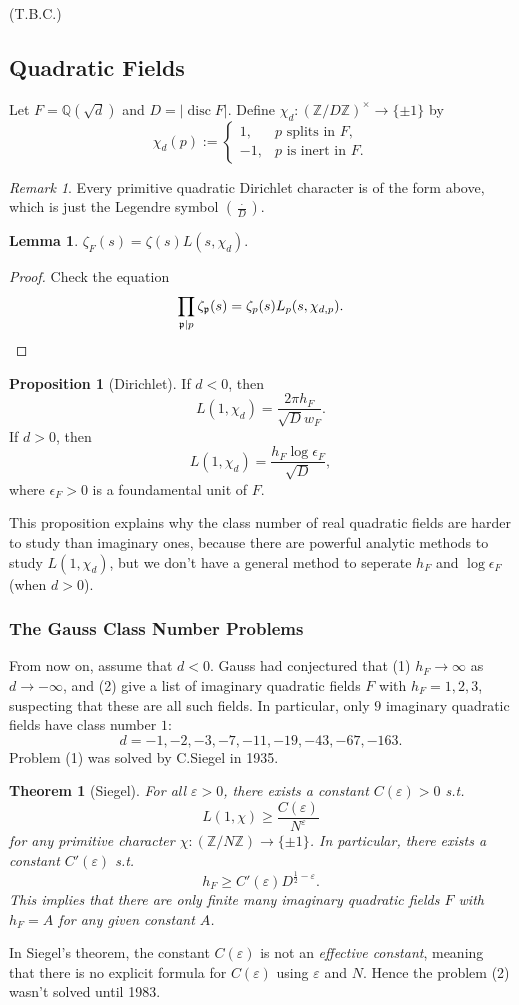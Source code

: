 \documentclass{article}
\newtheorem{theorem}{Theorem}
\theoremstyle{definition}
\newtheorem{proposition}{Proposition}[section]
\newtheorem{lemma}{Lemma}[section]
\theoremstyle{remark}
\newtheorem*{remark}{Remark}
\newcommand{\Q}{\mathbb{Q}}
\newcommand{\Z}{\mathbb{Z}}
\newcommand{\frp}{\mathfrak{p}}
\DeclareMathOperator{\disc}{disc}
\begin{document}
(T.B.C.)

\subsection{Quadratic Fields}
Let $F = \Q(\sqrt{d})$ and $D = |\disc F|$.
Define $\chi_d : (\Z/D\Z)^\times\to \{\pm 1\}$ by \[\chi_d(p) := \begin{cases}
    1,&p\text{ splits in }F,\\
    -1,&p\text{ is inert in }F.
\end{cases}\]
\begin{remark}
    Every primitive quadratic Dirichlet character is of the form above, which is just the Legendre symbol $\left( \frac{\cdot}{D} \right)$.
\end{remark}
\begin{lemma}
    $\zeta_F(s) = \zeta(s)L(s, \chi_d)$.
\end{lemma}
\begin{proof}
    Check the equation \[\prod_{\frp\mid p}\zeta_\frp(s) = \zeta_p(s)L_p(s, \chi_{d,p}).\qedhere\]
\end{proof}

\begin{proposition}[Dirichlet]
    If $d < 0$, then \[L(1, \chi_d) = \frac{2\pi h_F}{\sqrt{D}w_F}.\]
    If $d > 0$, then \[L(1, \chi_d) = \frac{h_F\log\epsilon_F}{\sqrt{D}},\]
    where $\epsilon_F > 0$ is a foundamental unit of $F$.
\end{proposition}
This proposition explains why the class number of real quadratic fields are harder to study than imaginary ones, because there are powerful analytic methods to study $L(1, \chi_d)$, but we don't have a general method to seperate $h_F$ and $\log\epsilon_F$ (when $d > 0$).

\subsubsection*{The Gauss Class Number Problems}
From now on, assume that $d < 0$.
Gauss had conjectured that (1) $h_F\to\infty$ as $d\to-\infty$, and (2) give a list of imaginary quadratic fields $F$ with $h_F = 1, 2, 3$, suspecting that these are all such fields.
In particular, only $9$ imaginary quadratic fields have class number $1$:
\[d = -1, -2, -3, -7, -11, -19, -43, -67, -163.\]
Problem (1) was solved by C.Siegel in 1935.
\begin{theorem}
    [Siegel]
    For all $\varepsilon>0$, there exists a constant $C(\varepsilon) > 0$ s.t. \[L(1, \chi) \ge \frac{C(\varepsilon)}{N^\varepsilon}\] for any primitive character $\chi:(\Z/N\Z)\to\{\pm 1\}$.
    In particular, there exists a constant $C'(\varepsilon)$ s.t. \[h_F \ge C'(\varepsilon)D^{\frac{1}{2}-\varepsilon}.\]
    This implies that there are only finite many imaginary quadratic fields $F$ with $h_F = A$ for any given constant $A$.
\end{theorem}
In Siegel's theorem, the constant $C(\varepsilon)$ is not an \textit{effective constant}, meaning that there is no explicit formula for $C(\varepsilon)$ using $\varepsilon$ and $N$.
Hence the problem (2) wasn't solved until 1983.
\end{document}

